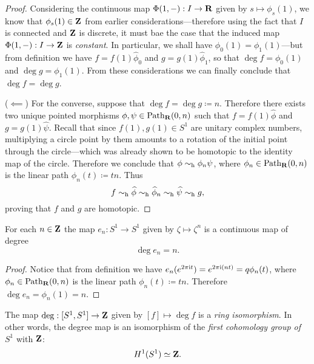 \begin{proof}
Considering the continuous map \(\Phi(1, -): I \to \mathbf{R}\) given by
\(s \mapsto \phi_s(1)\), we know that \(\phi_s(1) \in \mathbf{Z}\) from earlier
considerations---therefore using the fact that \(I\) is connected and \(\mathbf{Z}\) is
discrete, it must bae the case that the induced map \(\Phi(1, -): I \to \mathbf{Z}\) is
\emph{constant}. In particular, we shall have \(\phi_0(1) = \phi_1(1)\)---but
from definition we have \(f = f(1) \widehat \phi_0\) and
\(g = g(1) \widehat \phi_1\), so that \(\deg f = \phi_0(1)\) and
\(\deg g = \phi_1(1)\). From these considerations we can finally conclude that
\(\deg f = \deg g\).

(\(\impliedby\)) For the converse, suppose that \(\deg f = \deg g \coloneq
n\). Therefore there exists two unique pointed morphisms
\(\phi, \psi \in \operatorname{Path}_{\mathbf{R}}(0, n)\) such that \(f = f(1) \widehat \phi\) and
\(g = g(1) \widehat \psi\). Recall that since \(f(1), g(1) \in S^1\) are unitary
complex numbers, multiplying a circle point by them amounts to a rotation of the
initial point through the circle---which was already shown to be homotopic to
the identity map of the circle. Therefore we conclude that
\(\phi \sim_{\text{h}} \phi_n \psi\), where \(\phi_n \in \operatorname{Path}_{\mathbf{R}}(0, n)\) is the linear
path \(\phi_n(t) \coloneq t n\). Thus
\[
f \sim_{\text{h}} \widehat \phi
\sim_{\text{h}} \widehat \phi_n
\sim_{\text{h}} \widehat \psi
\sim_{\text{h}} g,
\]
proving that \(f\) and \(g\) are homotopic.
\end{proof}

\begin{lemma}
\label{lem:degree-nth-power-map-is-n}
For each \(n \in \mathbf{Z}\) the map \(e_n: S^1 \to S^1\) given by \(\zeta \mapsto
\zeta^n\) is a continuous map of degree
\[
\deg e_n = n.
\]
\end{lemma}

\begin{proof}
Notice that from definition we have \(e_n(e^{2 \pi \text{i} t}) = e^{2 \pi \text{i} (n
  t)} = q \phi_n(t)\), where \(\phi_n \in \operatorname{Path}_{\mathbf{R}}(0, n)\) is the linear path
\(\phi_n(t) \coloneq t n\). Therefore \(\deg e_n = \phi_n(1) = n\).
\end{proof}

\begin{theorem}
\label{thm:deg-is-ring-isomorphis}
The map \(\deg: [S^1, S^1] \to \mathbf{Z}\) given by \([f] \mapsto \deg f\) is a
\emph{ring isomorphism}. In other words, the degree map is an isomorphism of the
\emph{first cohomology group of \(S^1\)} with \(\mathbf{Z}\):
\[
H^1(S^1) \simeq \mathbf{Z}.
\]
\end{theorem}

